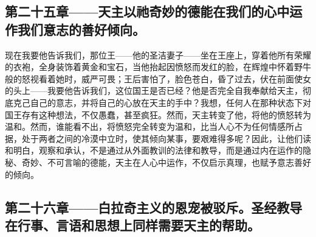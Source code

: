 \subsection{第二十五章——天主以祂奇妙的德能在我们的心中运作我们意志的善好倾向。}

现在我要他告诉我们，那位王——他的圣洁妻子——坐在王座上，穿着他所有荣耀的衣袍，全身装饰着黄金和宝石，当他抬起因愤怒而发红的脸，在辉煌中怀着野牛般的怒视看着她时，威严可畏；王后害怕了，脸色苍白，昏了过去，伏在前面使女的头上——我要他告诉我们，这位国王是否已经？他是否完全自我奉献给天主，彻底克己自己的意志，并将自己的心放在天主的手中？我想，任何人在那种状态下对国王存有这种想法，不仅愚蠢，甚至疯狂。然而，天主转变了他，将他的愤怒转为温和。然而，谁能看不出，将愤怒完全转变为温和，比当人心不为任何情感所占据，处于两者之间的冷漠中立时，使其倾向某事，要艰难得多呢？因此，让他们读和明白，观察和承认，不是通过从外面教训的法律和教导，而是通过内在运作的隐秘、奇妙、不可言喻的德能，天主在人心中运作，不仅启示真理，也赋予意志善好的倾向。\par


\subsection{第二十六章——白拉奇主义的恩宠被驳斥。圣经教导在行事、言语和思想上同样需要天主的帮助。}

